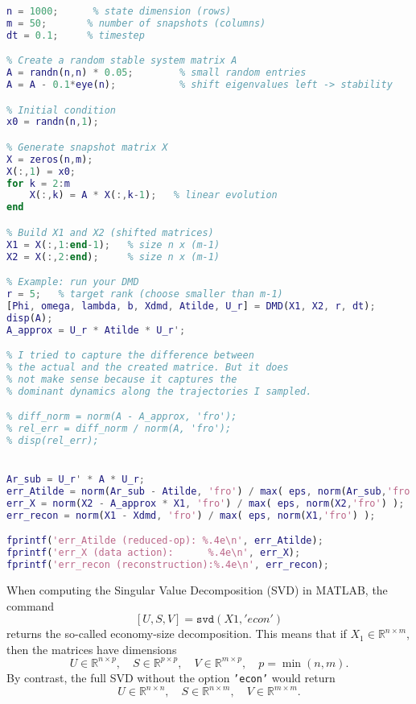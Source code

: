 \documentclass{article}
\begin{document}
\begin{lstlisting}[language=Matlab, caption={Main code}]
    % Dimensions
n = 1000;      % state dimension (rows)
m = 50;       % number of snapshots (columns)
dt = 0.1;     % timestep

% Create a random stable system matrix A
A = randn(n,n) * 0.05;        % small random entries
A = A - 0.1*eye(n);           % shift eigenvalues left -> stability

% Initial condition
x0 = randn(n,1);

% Generate snapshot matrix X
X = zeros(n,m);
X(:,1) = x0;
for k = 2:m
    X(:,k) = A * X(:,k-1);   % linear evolution
end

% Build X1 and X2 (shifted matrices)
X1 = X(:,1:end-1);   % size n x (m-1)
X2 = X(:,2:end);     % size n x (m-1)

% Example: run your DMD
r = 5;   % target rank (choose smaller than m-1)
[Phi, omega, lambda, b, Xdmd, Atilde, U_r] = DMD(X1, X2, r, dt);
disp(A);
A_approx = U_r * Atilde * U_r';

% I tried to capture the difference between 
% the actual and the created matrice. But it does 
% not make sense because it captures the
% dominant dynamics along the trajectories I sampled.

% diff_norm = norm(A - A_approx, 'fro');
% rel_err = diff_norm / norm(A, 'fro');
% disp(rel_err);


Ar_sub = U_r' * A * U_r;
err_Atilde = norm(Ar_sub - Atilde, 'fro') / max( eps, norm(Ar_sub,'fro') );
err_X = norm(X2 - A_approx * X1, 'fro') / max( eps, norm(X2,'fro') );
err_recon = norm(X1 - Xdmd, 'fro') / max( eps, norm(X1,'fro') );

fprintf('err_Atilde (reduced-op): %.4e\n', err_Atilde);
fprintf('err_X (data action):      %.4e\n', err_X);
fprintf('err_recon (reconstruction):%.4e\n', err_recon);

\end{lstlisting}


\vspace{1cm}

When computing the Singular Value Decomposition (SVD) in MATLAB, the command
\[
[U, S, V] = \texttt{svd}(X1,'econ')
\]
returns the so-called economy-size decomposition. This means that if $X_1 \in \mathbb{R}^{n \times m}$, then the matrices have dimensions
\[
U \in \mathbb{R}^{n \times p}, \quad S \in \mathbb{R}^{p \times p}, \quad V \in \mathbb{R}^{m \times p}, \quad p = \min(n,m).
\]
By contrast, the full SVD without the option \texttt{'econ'} would return
\[
U \in \mathbb{R}^{n \times n}, \quad S \in \mathbb{R}^{n \times m}, \quad V \in \mathbb{R}^{m \times m}.
\]
\end{document}
